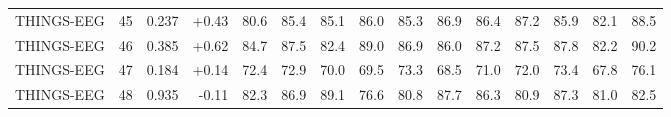 \begin{longtable}{@{}llrrrrrrrrrrrrr@{}}
THINGS-EEG & 45 & 0.237 & +0.43 & 80.6 & 85.4 & 85.1 & 86.0 & 85.3 & 86.9 & 86.4 & 87.2 & 85.9 & 82.1 & 88.5 \\
THINGS-EEG & 46 & 0.385 & +0.62 & 84.7 & 87.5 & 82.4 & 89.0 & 86.9 & 86.0 & 87.2 & 87.5 & 87.8 & 82.2 & 90.2 \\
THINGS-EEG & 47 & 0.184 & +0.14 & 72.4 & 72.9 & 70.0 & 69.5 & 73.3 & 68.5 & 71.0 & 72.0 & 73.4 & 67.8 & 76.1 \\
THINGS-EEG & 48 & 0.935 & -0.11 & 82.3 & 86.9 & 89.1 & 76.6 & 80.8 & 87.7 & 86.3 & 80.9 & 87.3 & 81.0 & 82.5 \\
\end{longtable}
\endgroup
